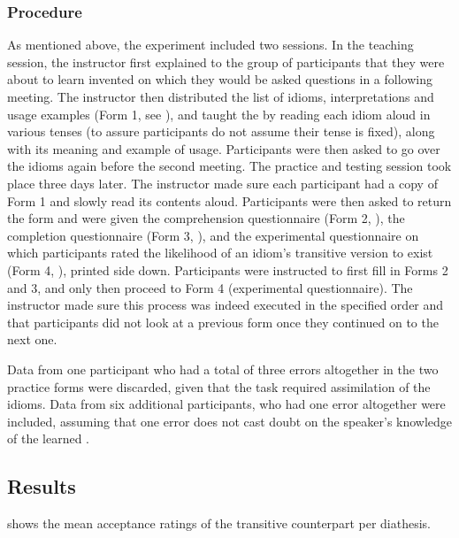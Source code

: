 \documentclass[output=paper]{langsci/langscibook}
\begin{document}
\subsubsection{Procedure} 
As mentioned above, the experiment included two
sessions. In the teaching session, the instructor first explained to the group
of participants that they were about to learn invented  on which they
would be asked questions in a following meeting. The instructor then
distributed the list of idioms, interpretations and usage examples (Form 1, see
), and taught the  by reading each idiom aloud in various
tenses (to assure participants do not assume their tense is fixed), along with
its meaning and example of usage. Participants were then asked to go over the
idioms again before the second meeting. The practice and testing session took
place three days later. The instructor made sure each participant had a copy of
Form 1 and slowly read its contents aloud. Participants were then asked to
return the form and were given the comprehension questionnaire (Form 2,
), the completion questionnaire (Form 3, ), and the
experimental questionnaire on which participants rated the likelihood of an
idiom’s transitive version to exist (Form 4, ), printed side
down.  Participants were instructed to first fill in Forms 2 and 3, and only
then proceed to Form 4 (experimental questionnaire). The instructor made sure
this process was indeed executed in the specified order and that participants
did not look at a previous form once they continued on to the next one.

Data from one participant who had a total of three errors altogether in the two
practice forms were discarded, given that the task required assimilation of the
idioms. Data from six additional participants, who had one error altogether were
included, assuming that one error does not cast doubt on the speaker’s
knowledge of the learned .

\subsection{Results}  %

 shows the mean acceptance ratings of the transitive counterpart per diathesis.
\end{document}
